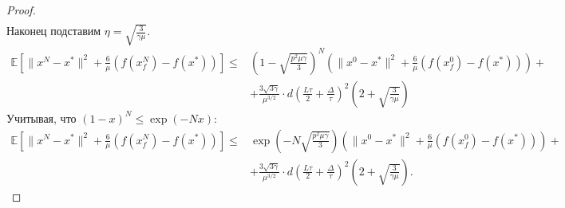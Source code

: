 \documentclass{article}
\begin{document}
\begin{proof}
\begin{align*}
\end{align*}
Наконец подставим $\eta = \sqrt{\frac{3}{\gamma\mu}}$.
\begin{align*}
    \mathbb{E}\left[\|x^N - x^*\|^2 + \frac{6}{\mu} (f(x_f^N) - f(x^*))\right] \leqslant& \left(1 - \sqrt{\frac{p^2\mu\gamma}{3}}\right)^N \left(\|x^0 - x^*\|^2 + \frac{6}{\mu} (f(x_f^0) - f(x^*))\right) +\\
    &+ \frac{3 \sqrt{3\gamma}}{\mu^{3/2}} \cdot d \left(\frac{L\tau}{2} + \frac{\Delta}{\tau}\right)^2\left(2 + \sqrt{\frac{3}{\gamma\mu}}\right)
\end{align*}
Учитывая, что $(1 - x)^N \leqslant \exp(-Nx)$:
\begin{align*}
    \mathbb{E}\left[\|x^N - x^*\|^2 + \frac{6}{\mu} (f(x_f^N) - f(x^*))\right] \leqslant& \exp\left(- N\sqrt{\frac{p^2\mu\gamma}{3}}\right) \left(\|x^0 - x^*\|^2 + \frac{6}{\mu} (f(x_f^0) - f(x^*))\right)+\\
    &+ \frac{3 \sqrt{3\gamma}}{\mu^{3/2}} \cdot d \left(\frac{L\tau}{2} + \frac{\Delta}{\tau}\right)^2\left(2 + \sqrt{\frac{3}{\gamma\mu}}\right).
\end{align*}
\end{proof}
\end{document}
